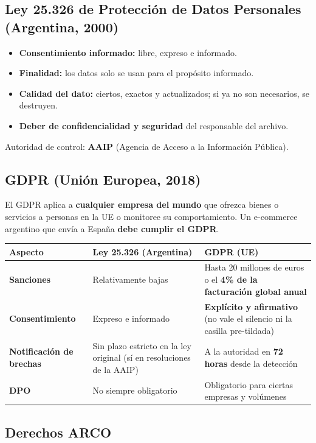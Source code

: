 \documentclass[12pt,a4paper]{article}
\begin{document}
\subsection{Ley 25.326 de Protecci\'on de Datos Personales (Argentina, 2000)}
\begin{itemize}
  \item \textbf{Consentimiento informado:} libre, expreso e informado.
  \item \textbf{Finalidad:} los datos solo se usan para el prop\'osito informado.
  \item \textbf{Calidad del dato:} ciertos, exactos y actualizados; si ya no son necesarios, se destruyen.
  \item \textbf{Deber de confidencialidad y seguridad} del responsable del archivo.
\end{itemize}
Autoridad de control: \textbf{AAIP} (Agencia de Acceso a la Informaci\'on P\'ublica).

\subsection{GDPR (Uni\'on Europea, 2018)}
\begin{cajaLegal}[title={Efecto extraterritorial}]
El GDPR aplica a \textbf{cualquier empresa del mundo} que ofrezca bienes o servicios
a personas en la UE o monitoree su comportamiento. Un e-commerce argentino que
env\'ia a Espa\~na \textbf{debe cumplir el GDPR}.
\end{cajaLegal}

\begin{tabularx}{\textwidth}{|>{\bfseries}p{3.2cm}|X|X|}
\hline
\rowcolor{grisClaro}
Aspecto & Ley 25.326 (Argentina) & GDPR (UE) \\
\hline
Sanciones & Relativamente bajas & Hasta 20 millones de euros o el \textbf{4\% de la facturaci\'on global anual} \\
\hline
Consentimiento & Expreso e informado & \textbf{Expl\'icito y afirmativo} (no vale el silencio ni la casilla pre-tildada) \\
\hline
Notificaci\'on de brechas & Sin plazo estricto en la ley original (s\'i en resoluciones de la AAIP) & A la autoridad en \textbf{72 horas} desde la detecci\'on \\
\hline
DPO & No siempre obligatorio & Obligatorio para ciertas empresas y vol\'umenes \\
\hline
\end{tabularx}

\subsection{Derechos ARCO}
\end{document}
